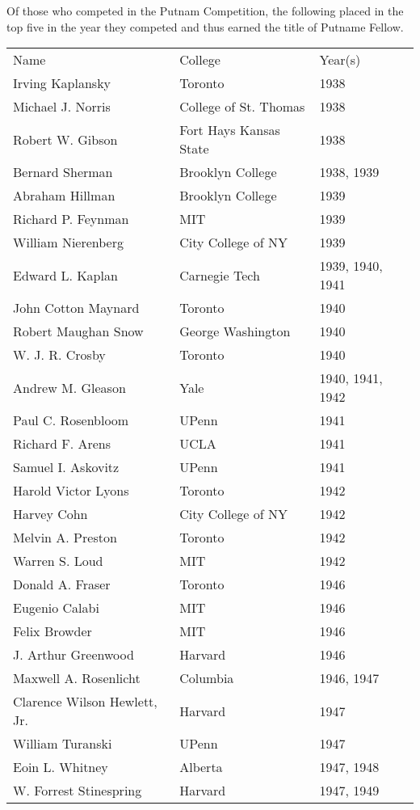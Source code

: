 \documentclass[12pt]{article}
\begin{document}
Of those who competed in the Putnam Competition, the following placed in the top five in the year they competed and thus earned the title of Putname Fellow.

\begin{tabular}{|l|l|l|}
Name & College & Year(s) \\
Irving Kaplansky & Toronto & 1938 \\ 
Michael J. Norris & College of St. Thomas & 1938 \\ 
Robert W. Gibson & Fort Hays Kansas State & 1938 \\ 
Bernard Sherman & Brooklyn College & 1938, 1939 \\
Abraham Hillman & Brooklyn College & 1939 \\
Richard P. Feynman & MIT & 1939 \\
William Nierenberg & City College of NY & 1939 \\
Edward L. Kaplan & Carnegie Tech & 1939, 1940, 1941 \\
John Cotton Maynard & Toronto & 1940 \\
Robert Maughan Snow & George Washington & 1940 \\
W. J. R. Crosby & Toronto & 1940 \\
Andrew M. Gleason & Yale & 1940, 1941, 1942 \\
Paul C. Rosenbloom & UPenn & 1941 \\
Richard F. Arens & UCLA & 1941 \\
Samuel I. Askovitz & UPenn & 1941 \\
Harold Victor Lyons & Toronto & 1942 \\
Harvey Cohn & City College of NY & 1942 \\
Melvin A. Preston & Toronto & 1942 \\
Warren S. Loud & MIT & 1942 \\
Donald A. Fraser & Toronto & 1946 \\
Eugenio Calabi & MIT & 1946 \\
Felix Browder & MIT & 1946 \\
J. Arthur Greenwood & Harvard & 1946 \\
Maxwell A. Rosenlicht & Columbia & 1946, 1947 \\
Clarence Wilson Hewlett, Jr. & Harvard & 1947 \\
William Turanski & UPenn & 1947 \\
Eoin L. Whitney & Alberta & 1947, 1948 \\
W. Forrest Stinespring & Harvard & 1947, 1949 \\

\end{tabular}
\end{document}
